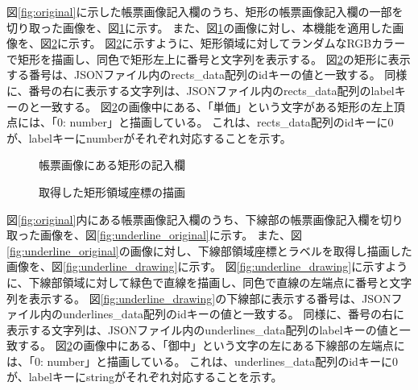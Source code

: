 図\ref{fig:original}に示した帳票画像記入欄のうち、矩形の帳票画像記入欄の一部を切り取った画像を、図\ref{fig:rect_original}に示す。
また、図\ref{fig:rect_original}の画像に対し、本機能を適用した画像を、図\ref{fig:rect_drawing}に示す。
図\ref{fig:rect_drawing}に示すように、矩形領域に対してランダムなRGBカラーで矩形を描画し、同色で矩形左上に番号と文字列を表示する。
図\ref{fig:rect_drawing}の矩形に表示する番号は、JSONファイル内のrects\_data配列のidキーの値と一致する。
同様に、番号の右に表示する文字列は、JSONファイル内のrects\_data配列のlabelキーのと一致する。
図\ref{fig:rect_drawing}の画像中にある、「単価」という文字がある矩形の左上頂点には、「0: number」と描画している。
これは、rects\_data配列のidキーに0が、labelキーにnumberがそれぞれ対応することを示す。

\begin{figure}[t]
    \begin{center}
        \caption{帳票画像にある矩形の記入欄}
        \label{fig:rect_original}
    \end{center}
\end{figure}

\begin{figure}[t]
    \begin{center}
        \caption{取得した矩形領域座標の描画}
        \label{fig:rect_drawing}
    \end{center}
\end{figure}

図\ref{fig:original}内にある帳票画像記入欄のうち、下線部の帳票画像記入欄を切り取った画像を、図\ref{fig:underline_original}に示す。
また、図\ref{fig:underline_original}の画像に対し、下線部領域座標とラベルを取得し描画した画像を、図\ref{fig:underline_drawing}に示す。
図\ref{fig:underline_drawing}に示すように、下線部領域に対して緑色で直線を描画し、同色で直線の左端点に番号と文字列を表示する。
図\ref{fig:underline_drawing}の下線部に表示する番号は、JSONファイル内のunderlines\_data配列のidキーの値と一致する。
同様に、番号の右に表示する文字列は、JSONファイル内のunderlines\_data配列のlabelキーの値と一致する。
図\ref{fig:rect_drawing}の画像中にある、「御中」という文字の左にある下線部の左端点には、「0: number」と描画している。
これは、underlines\_data配列のidキーに0が、labelキーにstringがそれぞれ対応することを示す。

